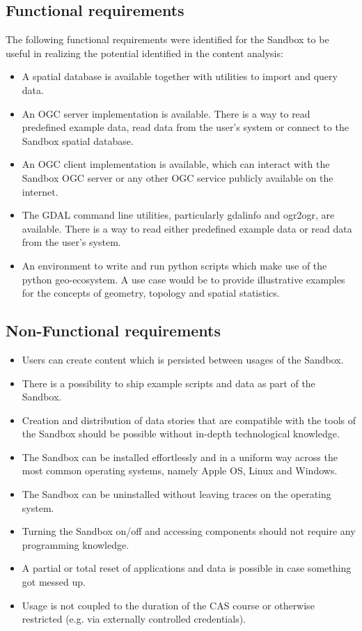 \documentclass[11pt, a4paper, oneside, parskip=full-]{scrartcl}
\begin{document}
\subsection{Functional requirements}
The following functional requirements were identified for the Sandbox to be
useful in realizing the potential identified in the content analysis:
\begin{itemize}
  \item A spatial database is available together with utilities to import and
  query data.
  \item An OGC server implementation is available. There is a way to read
  predefined example data, read data from the user's system or connect to the
  Sandbox spatial database.
  \item An OGC client implementation is available, which can interact with the
  Sandbox OGC server or any other OGC service publicly available on the
  internet.
  \item The GDAL\cite{gdal} command line utilities, particularly gdalinfo and
  ogr2ogr, are available. There is a way to read either predefined example data
  or read data from the user's system.
  \item An environment to write and run python scripts which make use of the
  python geo-ecosystem. A use case would be to provide illustrative examples for
  the concepts of geometry, topology and spatial statistics.
\end{itemize}

\subsection{Non-Functional requirements}
\begin{itemize}
  \item Users can create content which is persisted between usages of the
  Sandbox.
  \item There is a possibility to ship example scripts and data as part of the
  Sandbox.
  \item Creation and distribution of data stories that are compatible with the
  tools of the Sandbox should be possible without in-depth technological
  knowledge.
  \item The Sandbox can be installed effortlessly and in a uniform way across
  the most common operating systems, namely Apple OS, Linux and Windows.
  \item The Sandbox can be uninstalled without leaving traces on the operating
  system.
  \item Turning the Sandbox on/off and accessing components should not require
  any programming knowledge.
  \item A partial or total reset of applications and data is possible in case
  something got messed up.
  \item Usage is not coupled to the duration of the CAS course or otherwise
  restricted (e.g. via externally controlled credentials).
\end{itemize}
\end{document}
